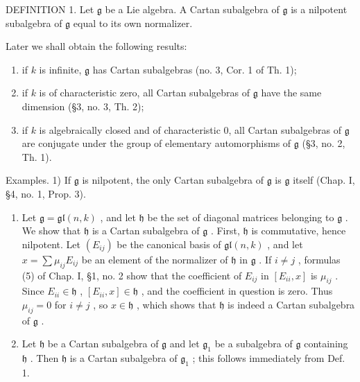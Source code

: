 DEFINITION 1. Let \(\mathfrak{g}\) be a Lie algebra. A Cartan subalgebra of \(\mathfrak{g}\) is a nilpotent subalgebra of \(\mathfrak{g}\) equal to its own normalizer.

Later we shall obtain the following results:

\begin{enumerate}
\def\labelenumi{\arabic{enumi})}
\item
  if \(k\) is infinite, \(\mathfrak{g}\) has Cartan subalgebras (no. 3, Cor. 1 of Th. 1);
\item
  if \(k\) is of characteristic zero, all Cartan subalgebras of \(\mathfrak{g}\) have the same dimension (§3, no. 3, Th. 2);
\item
  if \(k\) is algebraically closed and of characteristic 0, all Cartan subalgebras of \(\mathfrak{g}\) are conjugate under the group of elementary automorphisms of \(\mathfrak{g}\) (§3, no. 2, Th. 1).
\end{enumerate}

Examples. 1) If \(\mathfrak{g}\) is nilpotent, the only Cartan subalgebra of \(\mathfrak{g}\) is \(\mathfrak{g}\) itself (Chap. I, §4, no. 1, Prop. 3).

\begin{enumerate}
\def\labelenumi{\arabic{enumi})}
\setcounter{enumi}{1}
\item
  Let \(\mathfrak{g} = \mathfrak{gl}(n,k)\) , and let \(\mathfrak{h}\) be the set of diagonal matrices belonging to \(\mathfrak{g}\) . We show that \(\mathfrak{h}\) is a Cartan subalgebra of \(\mathfrak{g}\) . First, \(\mathfrak{h}\) is commutative, hence nilpotent. Let \((E_{ij})\) be the canonical basis of \(\mathfrak{gl}(n,k)\) , and let \(x = \sum \mu_{ij}E_{ij}\) be an element of the normalizer of \(\mathfrak{h}\) in \(\mathfrak{g}\) . If \(i\neq j\) , formulas (5) of Chap. I, §1, no. 2 show that the coefficient of \(E_{ij}\) in \([E_{ii},x]\) is \(\mu_{ij}\) . Since \(E_{ii}\in \mathfrak{h}\) , \([E_{ii},x]\in \mathfrak{h}\) , and the coefficient in question is zero. Thus \(\mu_{ij} = 0\) for \(i\neq j\) , so \(x\in \mathfrak{h}\) , which shows that \(\mathfrak{h}\) is indeed a Cartan subalgebra of \(\mathfrak{g}\) .
\item
  Let \(\mathfrak{h}\) be a Cartan subalgebra of \(\mathfrak{g}\) and let \(\mathfrak{g}_1\) be a subalgebra of \(\mathfrak{g}\) containing \(\mathfrak{h}\) . Then \(\mathfrak{h}\) is a Cartan subalgebra of \(\mathfrak{g}_1\) ; this follows immediately from Def. 1.
\end{enumerate}

